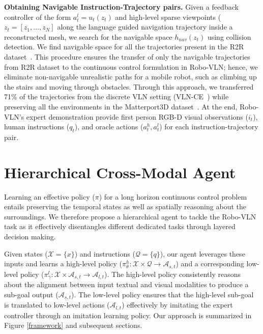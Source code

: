 \documentclass[letter, 10pt, conference]{ieeeconf}
\begin{document}
\textbf{Obtaining Navigable Instruction-Trajectory pairs.}
Given a feedback controller of the form $a^{l}_{t} = u_{t}(z_{t})$ and high-level sparse viewpoints ($z_{t} = [z_{1}, \ldots, z_{N}]$ along the language guided navigation trajectory inside a reconstructed mesh, we search for the navigable space $h_{nav}(z_{t})$ using collision detection.
We find navigable space for all the trajectories present in the R2R dataset~\cite{mattersim}.
This procedure ensures the transfer of only the navigable trajectories from R2R dataset to the continuous control formulation in Robo-VLN; hence, we eliminate non-navigable unrealistic paths for a mobile robot, such as climbing up the stairs and moving through obstacles. 
Through this approach, we transferred 71\% of the trajectories from the discrete VLN setting (VLN-CE~\cite{krantz2020navgraph}) while preserving all the environments in the Matterport3D dataset~\cite{Matterport3D}. At the end, Robo-VLN's expert demonstration provide first person RGB-D visual observations ($i_{t}$), human instructions ($q_{t}$), and oracle actions ($a^{h}_{t}, a^{l}_{t}$) for each instruction-trajectory pair.

\section{Hierarchical Cross-Modal Agent}
Learning an effective policy ($\pi$) for a long horizon continuous control problem entails preserving the temporal states as well as spatially reasoning about the surroundings. 
We therefore propose a hierarchical agent to tackle the Robo-VLN task as it effectively disentangles different dedicated tasks through layered decision making. 
\begin{comment}
Our approach is to decouple reasoning and imitation and learn a high-level policy ($\pi^{h}_{\theta}$) and a corresponding low-level policy ($\pi^{l}_{\gamma}$). 
\end{comment}
Given states ($\mathcal{X}=\{x\}$) and instructions ($\mathcal{Q}=\{q\}$), our agent leverages these inputs and learns a high-level policy ($\pi^{h}_{\theta}:\mathcal{X} \times \mathcal{Q} \rightarrow \mathcal{A}_{s,t}$) and a corresponding low-level policy ($\pi^{l}_{\gamma}:\mathcal{X} \times \mathcal{A}_{s,t} \rightarrow \mathcal{A}_{l,t}$). 
The high-level policy consistently reasons about the alignment between input textual and visual modalities to produce a sub-goal output ($\mathcal{A}_{s,t}$). The low-level policy ensures that the high-level sub-goal is translated to low-level actions ($\mathcal{A}_{l,t}$) effectively by imitating the expert controller through an imitation learning policy. Our approach is summarized in Figure \ref{framework} and subsequent sections.
\end{document}
